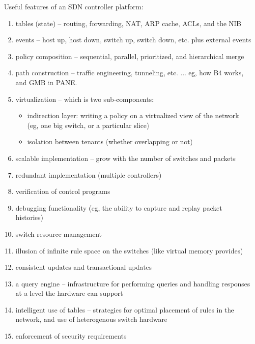 Useful features of an SDN controller platform:
\begin{enumerate}
\item tables (state) -- routing, forwarding, NAT, ARP cache, ACLs, and the NIB
\item events -- host up, host down, switch up, switch down, etc. plus external events
\item policy composition -- sequential, parallel, prioritized, and hierarchical merge
\item path construction -- traffic engineering, tunneling, etc. ... eg, how B4 works, and GMB in PANE.
\item virtualization -- which is two sub-components:
	\begin{itemize}
	\item indirection layer: writing a policy on a virtualized view of the network (eg, one big switch, or a particular slice)
	\item isolation between tenants (whether overlapping or not)
	\end{itemize}
\item scalable implementation -- grow with the number of switches and packets
\item redundant implementation (multiple controllers)
\item verification of control programs
\item debugging functionality (eg, the ability to capture and replay packet histories)
\item switch resource management
\item illusion of infinite rule space on the switches  (like virtual memory provides)
\item consistent updates and transactional updates
\item a query engine -- infrastructure for performing queries and handling responses at a level the hardware can support
\item intelligent use of tables -- strategies for optimal placement of rules in the network, and use of heterogenous switch hardware
\item enforcement of security requirements
\end{enumerate}


